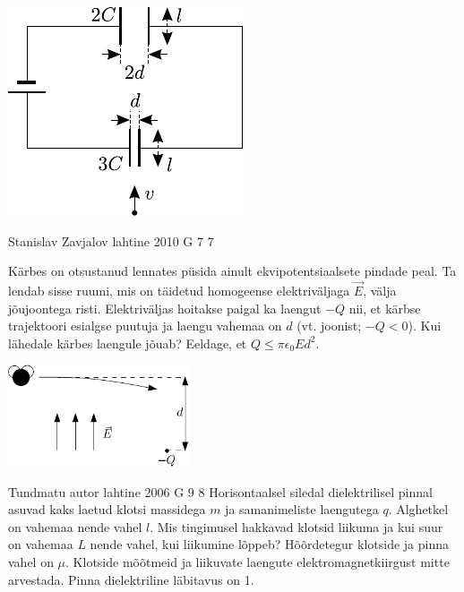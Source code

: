 \documentclass[11pt, twoside]{article}
\begin{document}
{{\begin{center}
	\includegraphics[width=0.6\linewidth]{2005-v3g-08-yl}
\end{center}
\fi
}

{Stanislav Zavjalov} %
{lahtine} %
{2010} %
{G 7} %
{7} %
{
\ifStatement
Kärbes on otsustanud
lennates püsida ainult ekvipotentsiaalsete pindade peal. Ta lendab sisse ruumi,
mis on täidetud homogeense elektriväljaga $\vec{E}$, välja jõujoontega risti.
Elektriväljas hoitakse paigal ka laengut $-Q$ nii, et kärbse
trajektoori esialgse puutuja ja laengu vahemaa on $d$ (vt. joonist; $-Q < 0$).
Kui lähedale kärbes laengule jõuab? Eeldage, et $Q \le \pi\epsilon_0Ed^2$.
\begin{center}
	\includegraphics[width=0.4\textwidth]{2010-lahg-07-muha_tekst}
\end{center}
\fi
}

{Tundmatu autor} %
{lahtine} %
{2006} %
{G 9} %
{8} %
{
\ifStatement
Horisontaalsel siledal dielektrilisel pinnal asuvad kaks laetud klotsi massidega $m$ ja samanimeliste laengutega $q$. Alghetkel on vahemaa nende vahel $l$. Mis tingimusel hakkavad klotsid liikuma ja kui suur on vahemaa $L$ nende vahel, kui liikumine lõppeb? Hõõrdetegur klotside ja pinna vahel on $\mu$. Klotside mõõtmeid ja liikuvate laengute elektromagnetkiirgust mitte arvestada. Pinna dielektriline läbitavus on 1.
\fi
}

}
\end{document}
